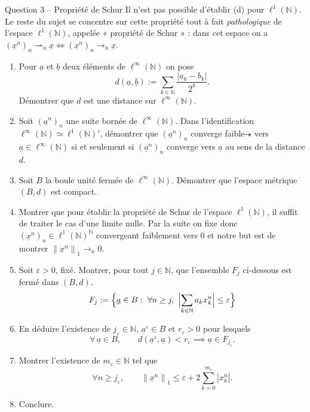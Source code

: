 \documentclass[11pt,a4paper]{article}
\newcommand{\N}{\mathbb{N}}
\newcommand{\norm}[1]{\left\|#1\right\|}
\newcommand{\wk}{\rightharpoonup}
\theoremstyle{definition}
\newcommand{\su}[1]{\underline{#1}}
\newcommand{\linf}{\ell^\infty(\N)}
\newcommand{\lun}{\ell^1(\N)}
\begin{document}
\begin{exo}{Question 3 -- Propriété de Schur}
Il n'est pas possible d'établir (d) pour $\lun$. Le reste du sujet se concentre sur cette propriété tout à fait \emph{pathologique} de l'espace $\lun$, appelée « propriété de Schur » : dans cet espace on a $(\su x^n)_n\wk_n\su x\iff(\su x^n)_n\to_n\su x$.
\begin{enumerate}[label=(\alph*)]
  \item Pour $\su a$ et $\su b$ deux éléments de $\linf$ on pose
  \[
    d(\su a,\su b):=\sum_{k\in\N}\frac{|a_k-b_k|}{2^k}.
  \]
  Démontrer que $d$ est une distance sur $\linf$.
  \item Soit $(\su a^n)_n$ une suite bornée de $\linf$. Dans l'identification $\linf\simeq\lun'$, démontrer que $(\su a^n)_n$ converge faible-$\star$ vers $\su a\in\linf$ si et seulement si $(\su a^n)_n$ converge vers $\su a$ au sens de la distance $d$.
  \item Soit $B$ la boule unité fermée de $\linf$. Démontrer que l'espace métrique $(B,d)$ est compact.
  \item Montrer que pour établir la propriété de Schur de l'espace $\lun$, il suffit de traiter le cas d'une limite nulle. Par la suite on fixe donc $(\su x^n)_n\in\lun^\N$ convergeant faiblement vers $0$ et notre but est de montrer $\norm{\su x^n}_1\to_n0$.
  \item Soit $\varepsilon>0$, fixé. Montrer, pour tout $j\in\N$, que l'ensemble $F_j$ ci-dessous est fermé dans $(B,d)$.
  \[
    F_j:=\Bigl\{\su a\in B:\ \forall n\ge j,\ \Bigl|\sum_{k\in\N}a_kx^n_k\Bigr|\le\varepsilon\Bigr\}
  \]
  \item En déduire l'existence de $j_\varepsilon\in\N$, $\su a^\varepsilon\in B$ et $r_\varepsilon>0$ pour lesquels
  \[
    \forall\,\su a\in B,\qquad d(\su a^\varepsilon,\su a)<r_\varepsilon\implies\su a\in F_{j_\varepsilon}.
  \]
  \item Montrer l'existence de $m_\varepsilon\in\N$ tel que
  \[
    \forall n\ge j_\varepsilon,\qquad\norm{\su x^n}_1\le\varepsilon+2\sum_{k=0}^{m_\varepsilon}|x^n_k|.
  \]
  \item Conclure.
\end{enumerate}
\end{exo}
\end{document}

